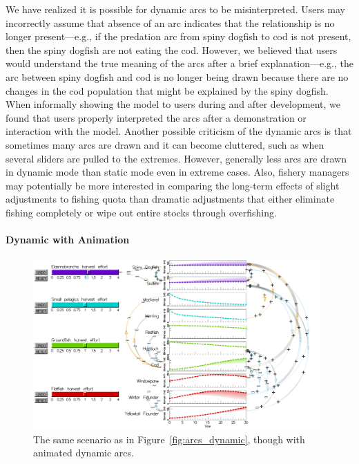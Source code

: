 We have realized it is possible for dynamic arcs to be misinterpreted.  Users may incorrectly assume that absence of an arc indicates that the relationship is no longer present---e.g., if the predation arc from spiny dogfish to cod is not present, then the spiny dogfish are not eating the cod.  However, we believed that users would understand the true meaning of the arcs after a brief explanation---e.g., the arc between spiny dogfish and cod is no longer being drawn because there are no changes in the cod population that might be explained by the spiny dogfish.  When informally showing the model to users during and after development, we found that users properly interpreted the arcs after a demonstration or interaction with the model.  Another possible criticism of the dynamic arcs is that sometimes many arcs are drawn and it can become cluttered, such as when several sliders are pulled to the extremes.  However, generally less arcs are drawn in dynamic mode than static mode even in extreme cases.  Also, fishery managers may potentially be more interested in comparing the long-term effects of slight adjustments to fishing quota than dramatic adjustments that either eliminate fishing completely or wipe out entire stocks through overfishing.

\paragraph{Dynamic with Animation} \label{sec:arcDynamicAnimated}

\begin{figure}[h]
	\centering
	\includegraphics[width=0.98\textwidth]{figures/png/arcs_dynamic_animated.png}
	\caption[The same scenario as in Figure~\ref{fig:arcs_dynamic}, though with animated dynamic arcs]{The same scenario as in Figure~\ref{fig:arcs_dynamic}, though with animated dynamic arcs.}
	\label{fig:arcs_dynamic_animated}
\end{figure}

